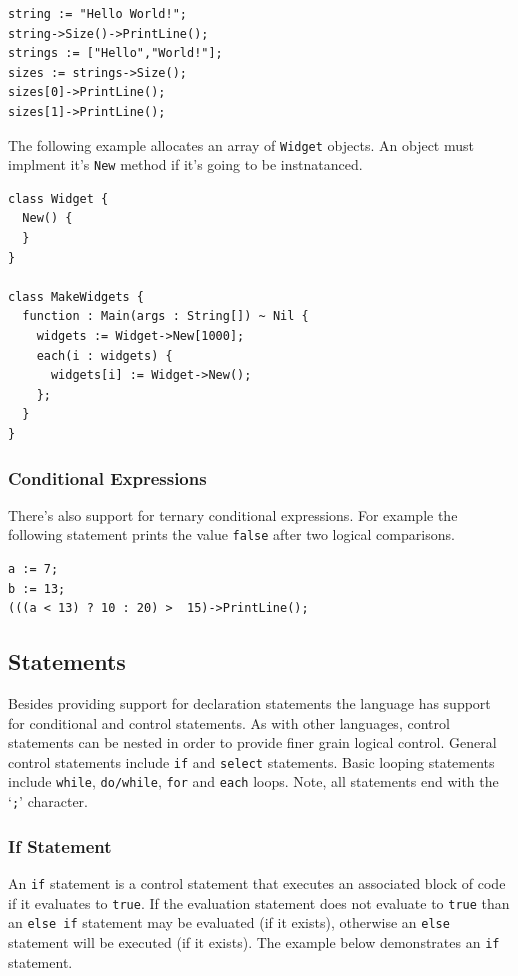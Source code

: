 \documentclass[11pt]{article}
\begin{document}
\begin{verbatim}
string := "Hello World!";
string->Size()->PrintLine();
strings := ["Hello","World!"];
sizes := strings->Size();
sizes[0]->PrintLine();
sizes[1]->PrintLine();
\end{verbatim}

The following example allocates an array of \texttt{Widget} objects.
An object must implment it's \texttt{New} method if it's going to be
instnatanced.

\begin{verbatim}
class Widget {
  New() {
  }
}

class MakeWidgets {
  function : Main(args : String[]) ~ Nil {
    widgets := Widget->New[1000];
    each(i : widgets) {
      widgets[i] := Widget->New();
    };
  }
}
\end{verbatim}

\subsubsection{Conditional Expressions}
There's also support for ternary conditional expressions.  For example
the following statement prints the value \texttt{false} after two
logical comparisons.

\begin{verbatim}
a := 7;
b := 13;
(((a < 13) ? 10 : 20) >  15)->PrintLine();
\end{verbatim}

\subsection{Statements}
Besides providing support for declaration statements the language has
support for conditional and control statements.  As with other
languages, control statements can be nested in order to provide finer
grain logical control. General control statements include \texttt{if}
and \texttt{select} statements. Basic looping statements include
\texttt{while}, \texttt{do/while}, \texttt{for} and \texttt{each}
loops.  Note, all statements end with the `\texttt{;}' character.

\subsubsection{If Statement}

An \texttt{if} statement is a control statement that executes an
associated block of code if it evaluates to \texttt{true}.  If the
evaluation statement does not evaluate to \texttt{true} than an
\texttt{else if} statement may be evaluated (if it exists), otherwise
an \texttt{else} statement will be executed (if it exists).  The
example below demonstrates an \texttt{if} statement.
\end{document}

